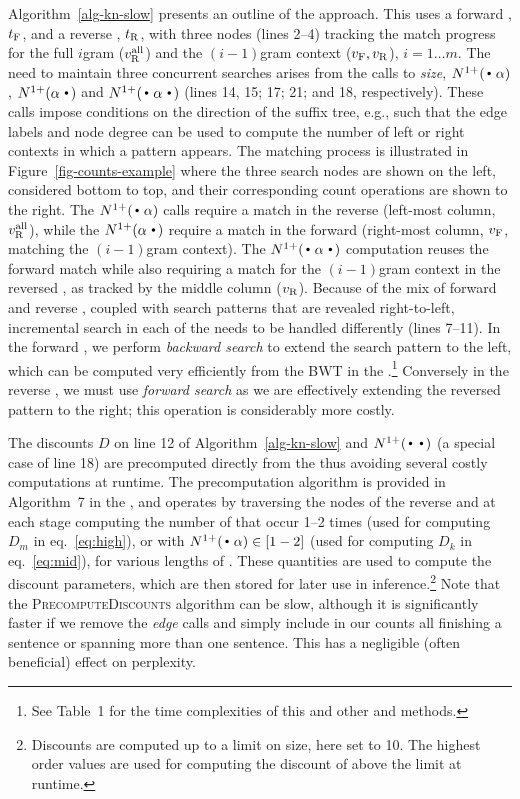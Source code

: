 Algorithm~\ref{alg-kn-slow} presents an outline of the approach.
This uses a forward \CST, $t_{\text{F}}$, and a reverse \CST, $t_{\text{R}}$, with three \CST nodes (lines 2--4) tracking the match progress for the full $i$gram ($v_{\text{R}}^{\text{all}}$) and the $(i-1)$gram context ($v_{\text{F}}, v_{\text{R}}$), $i=1 \ldots m$.
The need to maintain three concurrent searches arises from the calls to \emph{size}, $\nlplus{\dotpat}$, $\nlplus{\patdot}$ and $\nlplus{\dotpatdot}$ (lines 14, 15; 17; 21; and 18, respectively).
These calls impose conditions on the direction of the suffix tree, e.g., such that the edge 
labels and node degree can be used to compute the number of left or right contexts in which a pattern appears. 
The matching process is illustrated in Figure~\ref{fig-counts-example} where the three search nodes are shown on the left, considered bottom to top, and their corresponding count operations are shown to the right.
The $\nlplus{\dotpat}$ calls require a match in the reverse \CST (left-most column, $v_{\text{R}}^{\text{all}}$), while the $\nlplus{\patdot}$ require a match in the forward \CST (right-most column, $v_{\text{F}}$, matching the $(i-1)$gram context). 
The $\nlplus{\dotpatdot}$ computation reuses the forward match while also requiring a match for the $(i-1)$gram context in the reversed \CST, as tracked by the middle column ($v_{\text{R}}$).
Because of the mix of forward and reverse \CSTs, coupled with search patterns that are revealed right-to-left, incremental search in each of the \CSTs needs to be handled differently (lines 7--11).
In the forward \CST, we perform \emph{backward search} to extend the search pattern to the left, which can be computed very efficiently from the BWT in the \CSA.\footnote{See \supp Table~1 for the time complexities of this and other \CSA and \CST methods.}
Conversely in the reverse \CST, we must use \emph{forward search} as we are effectively extending the reversed pattern to the right; this operation is considerably more costly.

The discounts $D$ on line 12 of Algorithm~\ref{alg-kn-slow} and
$\nlplus{\Bigcdot\Bigcdot}$ (a special case of line 18) are precomputed directly from the \CSTs thus avoiding several costly computations at runtime. 
The precomputation algorithm is provided in Algorithm~7 in the \supp,
and operates by traversing the nodes of the reverse \CST and at each
stage computing the number of \ngrams that occur 1--2 times (used for computing $D_m$ in eq.~\ref{eq:high}), or with
$\nlplus{\dotpat} \in [1-2]$ (used for computing $D_k$ in eq.~\ref{eq:mid}), for various lengths of \ngrams.
These quantities are used to compute the discount parameters, which
are then stored for later use in inference.\footnote{Discounts are computed up to a limit on \ngram size, here set to 10. The highest order values are used for computing the discount of \ngrams above the limit at runtime.}
Note that the \textsc{PrecomputeDiscounts} algorithm can be slow,
although it is significantly faster if we remove the \emph{edge} calls
and simply include in our counts all \ngrams finishing a sentence or
spanning more than one sentence.
This has a negligible (often beneficial) effect on perplexity.

